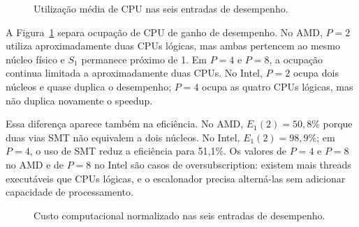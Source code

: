 \documentclass[12pt,a4paper]{article}
\begin{document}
\begin{figure}[htbp]
\centering
{}
\caption{Utilização média de CPU nas seis entradas de desempenho.}
\label{fig:cpu_runners}
\end{figure}

A Figura~\ref{fig:cpu_runners} separa ocupação de CPU de ganho de desempenho.
No AMD, $P=2$ utiliza aproximadamente duas CPUs lógicas, mas ambas pertencem ao
mesmo núcleo físico e $S_1$ permanece próximo de 1. Em $P=4$ e $P=8$, a
ocupação continua limitada a aproximadamente duas CPUs. No Intel, $P=2$ ocupa
dois núcleos e quase duplica o desempenho; $P=4$ ocupa as quatro CPUs lógicas,
mas não duplica novamente o speedup.

Essa diferença aparece também na eficiência. No AMD, $E_1(2)=50,8\%$ porque
duas vias SMT não equivalem a dois núcleos. No Intel, $E_1(2)=98,9\%$; em
$P=4$, o uso de SMT reduz a eficiência para 51,1\%. Os valores de $P=4$ e
$P=8$ no AMD e de $P=8$ no Intel são casos de oversubscription: existem mais
threads executáveis que CPUs lógicas, e o escalonador precisa alterná-las sem
adicionar capacidade de processamento.

\begin{figure}[htbp]
\centering
{}
\caption{Custo computacional normalizado nas seis entradas de desempenho.}
\label{fig:custo_runners}
\end{figure}
\end{document}
